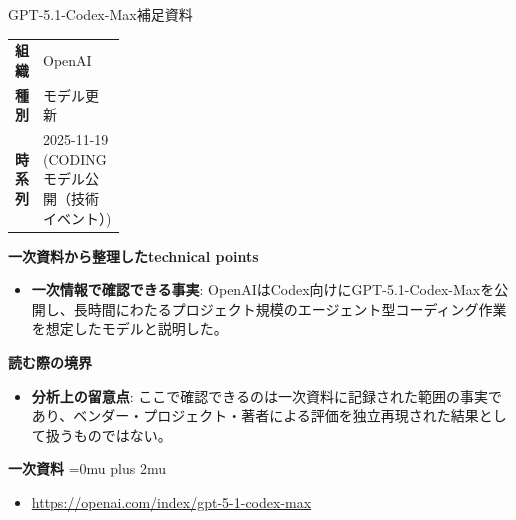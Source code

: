 \begin{technicalnote}{GPT-5.1-Codex-Max}{補足資料}
\begingroup
\begin{tabularx}{\linewidth}{@{}>{\bfseries}p{0.22\linewidth}X@{}}
組織 & OpenAI \\
種別 & モデル更新 \\
時系列 & 2025-11-19 (CODING モデル公開（技術イベント）) \\
\end{tabularx}
\smallskip
{\bfseries 一次資料から整理したtechnical points}
\begin{itemize}[leftmargin=1.5em,itemsep=0.35em]
\item \textbf{一次情報で確認できる事実}: OpenAIはCodex向けにGPT-5.1-Codex-Maxを公開し、長時間にわたるプロジェクト規模のエージェント型コーディング作業を想定したモデルと説明した。
\end{itemize}
\begin{minipage}{\linewidth}
{\bfseries 読む際の境界}
\begin{itemize}[leftmargin=1.5em,itemsep=0.35em]
\item \textbf{分析上の留意点}: ここで確認できるのは一次資料に記録された範囲の事実であり、ベンダー・プロジェクト・著者による評価を独立再現された結果として扱うものではない。
\end{itemize}
\begin{samepage}
{\bfseries 一次資料}
\begingroup\sloppy
\Urlmuskip=0mu plus 2mu\relax
\begin{itemize}[leftmargin=1.5em,itemsep=0.25em]
\item {\scriptsize\url{https://openai.com/index/gpt-5-1-codex-max}}
\end{itemize}
\endgroup
\end{samepage}
\end{minipage}
\endgroup
\end{technicalnote}
\medskip

